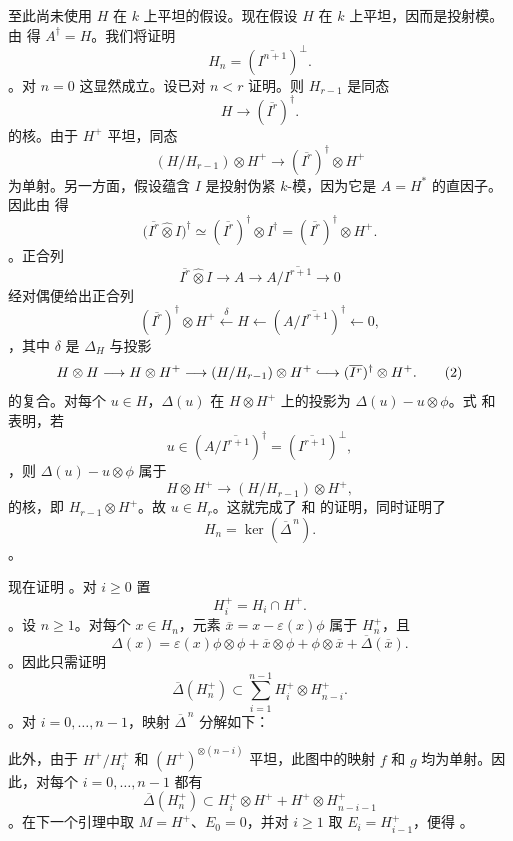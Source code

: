 至此尚未使用 \(H\) 在 \(k\) 上平坦的假设。现在假设 \(H\) 在 \(k\) 上平坦，因而是投射模。由  得 \(A^\dagger=H\)。我们将证明 \[
  H_n=(\overline{I^{n+1}})^\perp.
\]。对 \(n=0\) 这显然成立。设已对 \(n<r\) 证明。则 \(H_{r-1}\) 是同态 \[
  H\longrightarrow(\overline{I^r})^\dagger.
\] 的核。由于 \(H^+\) 平坦，同态 \[
  (H/H_{r-1})\otimes H^+
  \longrightarrow
  (\overline{I^r})^\dagger\otimes H^+
\] 为单射。另一方面，假设蕴含 \(I\) 是投射伪紧 \(k\)-模，因为它是 \(A=H^*\) 的直因子。因此由  得 \[
  \bigl(\overline{I^r}\widehat{\otimes}I\bigr)^\dagger
  \simeq
  (\overline{I^r})^\dagger\otimes I^\dagger
  =
  (\overline{I^r})^\dagger\otimes H^+.
\]。正合列 \[
  \overline{I^r}\widehat{\otimes}I
  \longrightarrow A
  \longrightarrow A/\overline{I^{r+1}}
  \longrightarrow0
\] 经对偶便给出正合列 \begin{equation}
  (\overline{I^r})^\dagger\otimes H^+
  \xleftarrow{\ \delta\ }
  H
  \longleftarrow
  (A/\overline{I^{r+1}})^\dagger
  \longleftarrow0,
  \tag{1}
  \label{sga3:VIIB:1.3.6.A:eq1}
\end{equation}，其中 \(\delta\) 是 \(\Delta_H\) 与投影 \begin{equation}
  H\otimes H
  \longrightarrow
  H\otimes H^+
  \longrightarrow
  (H/H_{r-1})\otimes H^+
  \lhook\joinrel\longrightarrow
  (\overline{I^r})^\dagger\otimes H^+.
  \tag{2}
  \label{sga3:VIIB:1.3.6.A:eq2}
\end{equation} 的复合。对每个 \(u\in H\)，\(\Delta(u)\) 在 \(H\otimes H^+\) 上的投影为 \(\Delta(u)-u\otimes\phi\)。式 \textup{} 和 \textup{} 表明，若 \[
  u\in
  (A/\overline{I^{r+1}})^\dagger
  =
  (\overline{I^{r+1}})^\perp,
\]，则 \(\Delta(u)-u\otimes\phi\) 属于 \[
  H\otimes H^+
  \longrightarrow
  (H/H_{r-1})\otimes H^+,
\] 的核，即 \(H_{r-1}\otimes H^+\)。故 \(u\in H_r\)。这就完成了 \textup{} 和 \textup{} 的证明，同时证明了 \[
  H_n=\ker(\overline{\Delta}^{\,n}).
\]。

现在证明 \textup{}。对 \(i\geq0\) 置 \[
  H_i^+=H_i\cap H^+.
\]。设 \(n\geq1\)。对每个 \(x\in H_n\)，元素 \(\overline x=x-\varepsilon(x)\phi\) 属于 \(H_n^+\)，且 \[
  \Delta(x)
  =
  \varepsilon(x)\phi\otimes\phi
  +\overline x\otimes\phi
  +\phi\otimes\overline x
  +\overline{\Delta}(\overline x).
\]。因此只需证明 \[
  \overline{\Delta}(H_n^+)
  \subset
  \sum_{i=1}^{n-1}H_i^+\otimes H_{n-i}^+.
\]。对 \(i=0,\ldots,n-1\)，映射 \(\overline{\Delta}^{\,n}\) 分解如下：\begin{center} \label{sga3:VIIB:1.3.6.A:iterated-reduced-comultiplication}
\end{center}此外，由于 \(H^+/H_i^+\) 和 \((H^+)^{\otimes(n-i)}\) 平坦，此图中的映射 \(f\) 和 \(g\) 均为单射。因此，对每个 \(i=0,\ldots,n-1\) 都有 \[
  \overline{\Delta}(H_n^+)
  \subset
  H_i^+\otimes H^+
  +
  H^+\otimes H_{n-i-1}^+
\]。在下一个引理中取 \(M=H^+\)、\(E_0=0\)，并对 \(i\geq1\) 取 \(E_i=H_{i-1}^+\)，便得 \textup{}。

